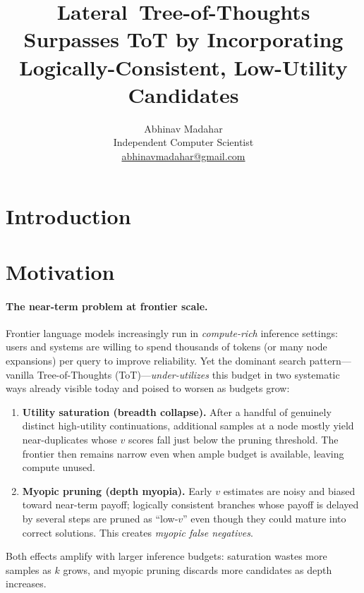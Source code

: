 \documentclass{article}
\title{Lateral~Tree\mbox{-}of\mbox{-}Thoughts Surpasses ToT by Incorporating Logically\mbox{-}Consistent, Low\mbox{-}Utility Candidates}
\author{Abhinav Madahar \\ Independent Computer Scientist \\ \href{mailto:abhinavmadahar@gmail.com}{abhinavmadahar@gmail.com}}
\begin{document}
\maketitle

\begin{abstract}
\end{abstract}

\section{Introduction}
\label{section:introduction}

\section{Motivation}
\label{section:motivation}
\paragraph{The near-term problem at frontier scale.}
Frontier language models increasingly run in \emph{compute-rich} inference settings:
users and systems are willing to spend thousands of tokens (or many node expansions) per query to improve reliability.
Yet the dominant search pattern—vanilla Tree-of-Thoughts (ToT)—\emph{under-utilizes} this budget in two systematic ways already visible today and poised to worsen as budgets grow:
\begin{enumerate}[leftmargin=*, itemsep=2pt, topsep=2pt]
    \item \textbf{Utility saturation (breadth collapse).} After a handful of genuinely distinct high-utility continuations, additional samples at a node mostly yield near-duplicates whose $v$ scores fall just below the pruning threshold. The frontier then remains narrow even when ample budget is available, leaving compute unused.
    \item \textbf{Myopic pruning (depth myopia).} Early $v$ estimates are noisy and biased toward near-term payoff; logically consistent branches whose payoff is delayed by several steps are pruned as ``low-$v$'' even though they could mature into correct solutions. This creates \emph{myopic false negatives}.
\end{enumerate}
Both effects amplify with larger inference budgets: saturation wastes more samples as $k$ grows, and myopic pruning discards more candidates as depth increases.
\end{document}
